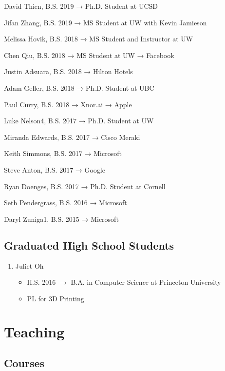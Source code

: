 \documentclass[10pt]{article}
\begin{document}
David Thien, B.S. 2019
    → Ph.D. Student at UCSD

Jifan Zhang, B.S. 2019
    → MS Student at UW with Kevin Jamieson

Melissa Hovik, B.S. 2018
    → MS Student and Instructor at UW

Chen Qiu, B.S. 2018
    → MS Student at UW
    → Facebook

Justin Adsuara, B.S. 2018
    → Hilton Hotels

Adam Geller, B.S. 2018
    → Ph.D. Student at UBC

Paul Curry, B.S. 2018
    → Xnor.ai
    → Apple

Luke Nelson4, B.S. 2017
    → Ph.D. Student at UW

Miranda Edwards, B.S. 2017
    → Cisco Meraki

Keith Simmons, B.S. 2017
    → Microsoft

Steve Anton, B.S. 2017
    → Google

Ryan Doenges, B.S. 2017
    → Ph.D. Student at Cornell

Seth Pendergrass, B.S. 2016
    → Microsoft

Daryl Zuniga1, B.S. 2015
    → Microsoft

\subsection*{Graduated High School Students}

\begin{enumerate}[resume]
  \item Juliet Oh
    \begin{itemize}
      \item H.S. 2016 $\rightarrow$ B.A. in Computer Science at Princeton University
      \item PL for 3D Printing
    \end{itemize}
\end{enumerate}


\section*{Teaching}

\subsection*{Courses}
\end{document}
